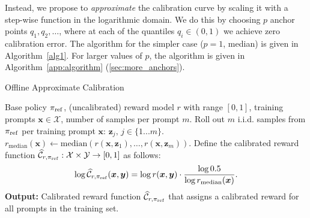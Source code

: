 \documentclass{article}
\newcommand{\by}{{\bm{y}}}
\newcommand{\bx}{{\bm{x}}}
\newcommand{\bz}{{\bm{z}}}
\newcommand{\bp}{{\pi_{\rm ref}}} %
\newcommand{\car}{\mathcal{C}} %
\begin{document}
Instead, we propose to {\em approximate} the calibration curve by scaling it with a step-wise function in the logarithmic domain. We do this by choosing $p$ anchor points $q_1, q_2,\ldots$, where at each of the quantiles $q_i \in (0,1)$ we achieve zero calibration error.
%
The algorithm for the simpler case ($p=1$, median) is given in Algorithm~\ref{alg1}. For larger values of $p$, the algorithm is given in Algorithm~\ref{app:algorithm} (\cref{sec:more_anchors}). 
%
%
%


%


%

\begin{algorithm}[ht]
\caption{Offline Approximate Calibration} \label{alg1}
\begin{algorithmic}[1]
\Require Base policy $\bp$, (uncalibrated) reward model $r$ with range $[0, 1]$, training prompts $\bx \in \mathcal{X}$, number of samples per prompt $m$. 
%
%
\ForAll{$\bx \in \mathcal{X}$}
\State Roll out $m$ i.i.d. samples from $\bp$ per training prompt $\bx$: $\bz_{j},\, j \in \{1...m\}$. %
%
%
%
\State $r_{\text{median}}(\bx) \leftarrow \text{median}(r(\bx, \bz_{1}), \ldots, r(\bx, \bz_{m}))$.
%
\EndFor
%
\State Define the calibrated reward function $\widehat{\car}_{r, \bp}: \mathcal{X} \times \mathcal{Y} \to [0, 1]$ as follows:
\begin{align*}
  \log \widehat{\car}_{r, \bp}(\bx, \by) =
  \log  r(\bx, \by) \cdot 
  \frac
  {
  \log 0.5 
  }
  {\log  r_{\text{median}}(\bx)  } .
\end{align*}
 \State \textbf{Output:} Calibrated reward function  $\widehat{\car}_{r, \bp}$ that assigns a calibrated reward for all prompts in the training set.
\end{algorithmic}
\end{algorithm}




%
%


%

%
%
%
%
%
%
%
%
%
%
%
%
%

%
%
%
%
%
%

%
%
%
%
%

%
%
%
%
%
%
%
%
%
%

%
%



%



%
%


%



%

%
\end{document}

